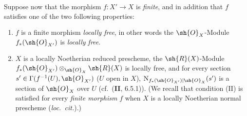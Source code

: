 \begin{env}[21.5.3]
\label{IV.21.5.3}
Suppose now that the morphism $f:X'\to X$ is \emph{finite}, and in addition that $f$ satisfies one of the two following properties:
\begin{enumerate}[label=\Roman*)]
  \item $f$ is a finite morphism \emph{locally free}, in other words  the $\sh{O}_X$-Module $f_*(\sh{O}_{X'})$ is \emph{locally free}.
  \item $X$ is a locally Noetherian reduced prescheme, the $\sh{R}(X)$-Module $f_*(\sh{O}_{X'})\otimes_{\sh{O}_X}\sh{R}(X)$ is locally free, and for every section $s'\in\Gamma(f^{-1}(U),\sh{O}_{X'})$ ($U$ open
in $X$), $\mathrm{N}_{f_*(\sh{O}_{X'})|\sh{O}_X}(s')$ is a section of $\sh{O}_X$ over $U$ (cf.\ (\textbf{II}, 6.5.1)).
  (We recall that condition (II) is satisfied for every \emph{finite morphism} $f$ when $X$ is a locally Noetherian normal prescheme (\emph{loc.\ cit.}).)
\end{enumerate}


\end{env}
